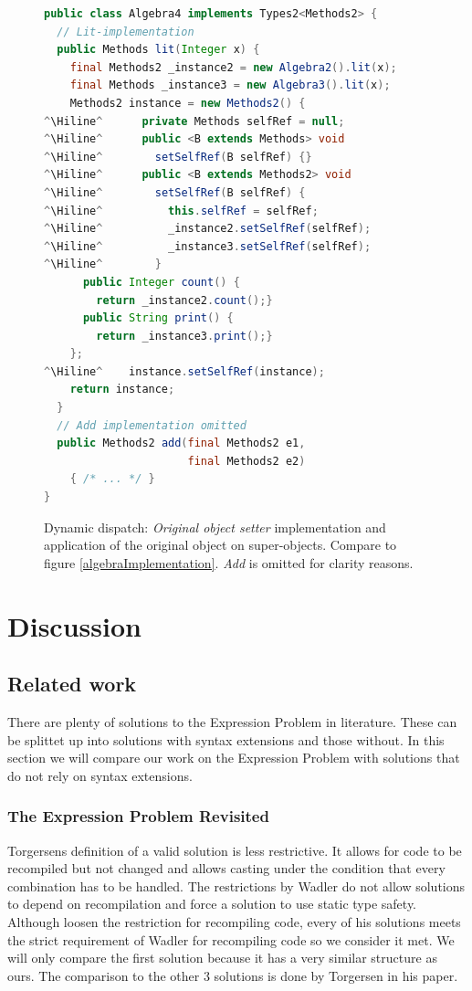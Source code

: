 \documentclass{report}
\newcommand{\Hiline}{\makebox[0pt][l]{\color[rgb]{1,0.96,0.98}\rule[-4pt]{\linewidth}{12.5pt}}}
\begin{document}
\begin{figure}[H]
\begin{lstlisting}[language=java]
public class Algebra4 implements Types2<Methods2> {
  // Lit-implementation
  public Methods lit(Integer x) {
    final Methods2 _instance2 = new Algebra2().lit(x);
    final Methods _instance3 = new Algebra3().lit(x);
    Methods2 instance = new Methods2() {
^\Hiline^      private Methods selfRef = null;
^\Hiline^      public <B extends Methods> void
^\Hiline^        setSelfRef(B selfRef) {}
^\Hiline^      public <B extends Methods2> void
^\Hiline^        setSelfRef(B selfRef) {
^\Hiline^          this.selfRef = selfRef;
^\Hiline^          _instance2.setSelfRef(selfRef);
^\Hiline^          _instance3.setSelfRef(selfRef);
^\Hiline^        }
      public Integer count() {
        return _instance2.count();}
      public String print() {
        return _instance3.print();}
    };
^\Hiline^    instance.setSelfRef(instance);
    return instance;
  }
  // Add implementation omitted
  public Methods2 add(final Methods2 e1,
                      final Methods2 e2)
    { /* ... */ }
}
\end{lstlisting}
\caption{Dynamic dispatch: \emph{Original object setter} implementation and application of the original object on super-objects. Compare to figure \ref{algebraImplementation}. \emph{Add} is omitted for clarity reasons.}
\label{dynamicDispatchAlgebra}
\end{figure}

\section{Discussion}

\subsection{Related work}

There are plenty of solutions to the Expression Problem in literature. These can be splittet up into solutions with syntax extensions and those without. In this section we will compare our work on the Expression Problem with solutions that do not rely on syntax extensions.

\subsubsection*{The Expression Problem Revisited\cite{Torgersen-Expression-2004}}

Torgersens definition of a valid solution is less restrictive. It allows for code to be recompiled but not changed and allows casting under the condition that every combination has to be handled. The restrictions by Wadler \cite{Wadler-Expression-1998} do not allow solutions to depend on recompilation and force a solution to use static type safety. Although loosen the restriction for recompiling code, every of his solutions meets the strict requirement of Wadler for recompiling code so we consider it met. We will only compare the first solution because it has a very similar structure as ours. The comparison to the other 3 solutions is done by Torgersen in his paper.
\end{document}
